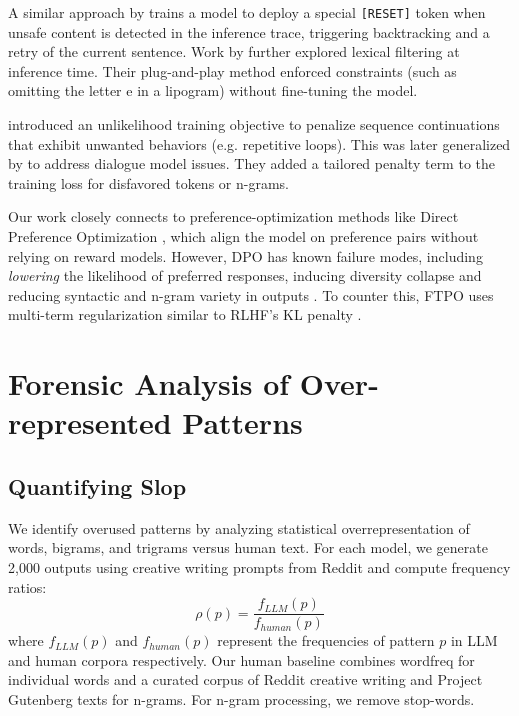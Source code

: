 \documentclass[11pt]{article}
\begin{document}
A similar approach by \citet{zhang-etal-2025-safety} trains a model to deploy a special \texttt{[RESET]} token when unsafe content is detected in the inference trace, triggering backtracking and a retry of the current sentence. Work by \citet{roush-etal-2022-language} further explored lexical filtering at inference time. Their plug-and-play method enforced constraints (such as omitting the letter e in a lipogram) without fine-tuning the model.





 \citet{welleck-etal-2020-neural} introduced an unlikelihood training objective to penalize sequence continuations that exhibit unwanted behaviors (e.g. repetitive loops). This was later generalized by \citet{li-etal-2020-dont} to address dialogue model issues. They added a tailored penalty term to the training loss for disfavored tokens or n-grams.
 


Our work closely connects to preference-optimization methods like Direct Preference Optimization \citep{rafailov-etal-2023-direct}, which align the model on preference pairs without relying on reward models. However, DPO has known failure modes, including \textit{lowering} the likelihood of preferred responses, inducing diversity collapse and reducing syntactic and n-gram variety in outputs \citep{razin2024unintentional,lanchantin2025divpo,shypula2025diversity}. To counter this, FTPO uses multi-term regularization similar to RLHF's KL penalty \citep{stiennon2020learning}.



\section{Forensic Analysis of Over-represented Patterns}
\subsection{Quantifying Slop}
We identify overused patterns by analyzing statistical overrepresentation of words, bigrams, and trigrams versus human text. For each model, we generate 2,000 outputs using creative writing prompts from Reddit \citep{nitral_reddit_sfw_wp_sharegpt} and compute frequency ratios:
{\setlength{\abovedisplayskip}{6pt plus 2pt minus 2pt}%
 \setlength{\belowdisplayskip}{6pt plus 2pt minus 2pt}%
 \setlength{\abovedisplayshortskip}{4pt}%
 \setlength{\belowdisplayshortskip}{4pt}%
 \[
   \rho(p) = \frac{f_{LLM}(p)}{f_{human}(p)}
 \]
}
where $f_{LLM}(p)$ and $f_{human}(p)$ represent the frequencies of pattern $p$ in LLM and human corpora respectively. Our human baseline combines wordfreq \citep{robyn_speer_2018_1443582} for individual words and a curated corpus of Reddit creative writing and Project Gutenberg texts for n-grams. For n-gram processing, we remove stop-words.
\end{document}
